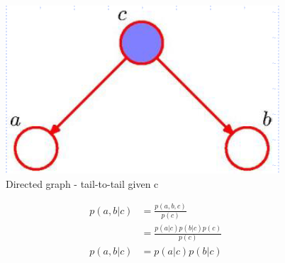 \begin{figure}[H]
 \centering 
\includegraphics[scale=0.42]{images/tail-to-tail-given-c.png} 
 \caption{Directed graph - tail-to-tail given c}
 \label{fig:tail-to-tail-given-c}
\end{figure}
\begin{align*}
    p(a,b|c) & = \frac{p(a,b,c)}{p(c)} \\
    & = \frac{p(a|c)p(b|c)p(c)}{p(c)} \\
    p(a,b|c) & = p(a|c)p(b|c) \\
\end{align*}

